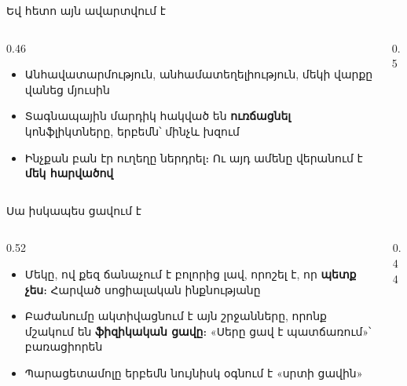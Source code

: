 \begin{frame}{Եվ հետո այն ավարտվում է}
  \begin{columns}[T]
    \begin{column}{0.46\textwidth}
      \begin{itemize}
        \item Անհավատարմություն, անհամատեղելիություն, մեկի վարքը վանեց մյուսին
        \item Տագնապային մարդիկ հակված են \textbf{ուռճացնել} կոնֆլիկտները, երբեմն՝ մինչև խզում
        \item<2-> Ինչքան բան էր ուղեղը ներդրել։ Ու այդ ամենը վերանում է \textbf{մեկ հարվածով}
      \end{itemize}
    \end{column}
    \begin{column}{0.5\textwidth}
    \end{column}
  \end{columns}
\end{frame}

\begin{frame}{Սա իսկապես ցավում է}
  \begin{columns}[T]
    \begin{column}{0.52\textwidth}
      \begin{itemize}
        \item Մեկը, ով քեզ ճանաչում է բոլորից լավ, որոշել է, որ \textbf{պետք չես}։ Հարված սոցիալական ինքնությանը
        \item<2-> Բաժանումը ակտիվացնում է այն շրջանները, որոնք մշակում են \textbf{ֆիզիկական ցավը}։ «Սերը ցավ է պատճառում»՝ բառացիորեն
        \item<2-> Պարացետամոլը երբեմն նույնիսկ օգնում է «սրտի ցավին»
      \end{itemize}
    \end{column}
    \begin{column}{0.44\textwidth}
    \end{column}
  \end{columns}
\end{frame}

